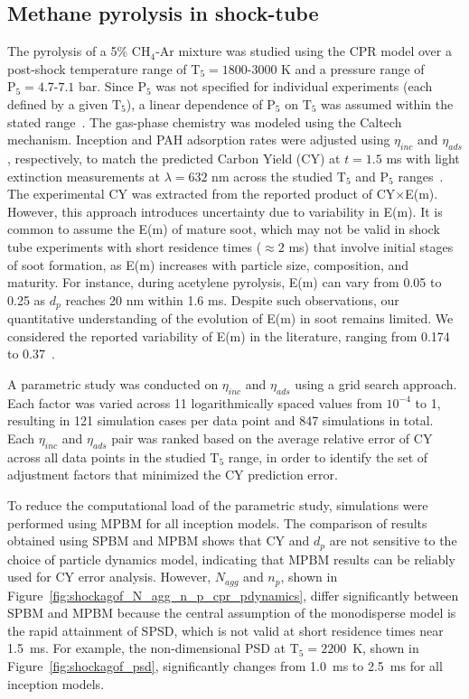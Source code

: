 \subsection{Methane pyrolysis in shock-tube}

The pyrolysis of a 5\% $\mathrm{CH_4}$-Ar mixture was studied using the CPR model over a post-shock temperature range of $\mathrm{T_5} = 1800$-$3000$ K and a pressure range of $\mathrm{P_5} = 4.7$-$7.1$ bar. Since $\mathrm{P_5}$ was not specified for individual experiments (each defined by a given $\mathrm{T_5}$), a linear dependence of $\mathrm{P_5}$ on $\mathrm{T_5}$ was assumed within the stated range~\citep{agafonov2016unified}. The gas-phase chemistry was modeled using the Caltech mechanism. Inception and PAH adsorption rates were adjusted using $\eta_{inc}$ and $\eta_{ads}$, respectively, to match the predicted Carbon Yield (CY) at $t = 1.5$ ms with light extinction measurements at $\lambda = 632$ nm across the studied $\mathrm{T_5}$ and $\mathrm{P_5}$ ranges~\citep{agafonov2016unified}. The experimental CY was extracted from the reported product of CY$\times$E(m). However, this approach introduces uncertainty due to variability in E(m). It is common to assume the E(m) of mature soot, which may not be valid in shock tube experiments with short residence times ($\approx 2$ ms) that involve initial stages of soot formation, as E(m) increases with particle size, composition, and maturity. For instance, during acetylene pyrolysis, E(m) can vary from 0.05 to 0.25 as $d_p$ reaches 20 nm within 1.6 ms. Despite such observations, our quantitative understanding of the evolution of E(m) in soot remains limited. We considered the reported variability of E(m) in the literature, ranging from 0.174~\citep{lee1981optical} to 0.37~\citep{agafonov2011soot}.

A parametric study was conducted on $\eta_{inc}$ and $\eta_{ads}$ using a grid search approach. Each factor was varied across 11 logarithmically spaced values from $10^{-4}$ to 1, resulting in 121 simulation cases per data point and 847 simulations in total. Each $\eta_{inc}$ and $\eta_{ads}$ pair was ranked based on the average relative error of CY across all data points in the studied $\mathrm{T_5}$ range, in order to identify the set of adjustment factors that minimized the CY prediction error. 

To reduce the computational load of the parametric study, simulations were performed using MPBM for all inception models. The comparison of results obtained using SPBM and MPBM shows that CY and $d_p$ are not sensitive to the choice of particle dynamics model, indicating that MPBM results can be reliably used for CY error analysis. However, $N_{agg}$ and $n_p$, shown in Figure~\ref{fig:shockagof_N_agg_n_p_cpr_pdynamics}, differ significantly between SPBM and MPBM because the central assumption of the monodisperse model is the rapid attainment of SPSD, which is not valid at short residence times near 1.5~ms. For example, the non-dimensional PSD at $\mathrm{T_5}=2200$~K, shown in Figure~\ref{fig:shockagof_psd}, significantly changes from 1.0~ms to 2.5~ms for all inception models.

